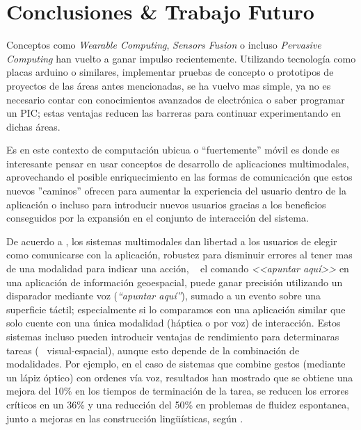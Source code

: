 
\chapter{Conclusiones \& Trabajo Futuro} %

\label{ch:end_future} %
Conceptos como \emph{Wearable Computing}, \emph{Sensors Fusion} o incluso \emph{Pervasive Computing} han vuelto a ganar impulso recientemente. Utilizando tecnología como placas arduino o similares, implementar pruebas de concepto o prototipos de proyectos de las áreas antes mencionadas, se ha vuelvo mas simple, ya no es necesario contar con conocimientos avanzados de electrónica o saber programar un PIC; estas ventajas reducen las barreras para continuar experimentando en dichas áreas.

Es en este contexto de computación ubicua o ``fuertemente'' móvil es donde es interesante pensar en usar conceptos de desarrollo de aplicaciones multimodales, aprovechando el posible enriquecimiento en las formas de comunicación que estos nuevos ''caminos'' ofrecen para aumentar la experiencia del usuario dentro de la aplicación o incluso para introducir nuevos usuarios gracias a los beneficios conseguidos por la expansión en el conjunto de interacción del sistema.


De acuerdo a \citet{kortum2008hci}, los sistemas multimodales dan libertad a los usuarios de elegir como comunicarse con la aplicación, robustez para disminuir errores al tener mas de una modalidad para indicar una acción, \eg~ el comando \emph{<<apuntar aquí>>} en una aplicación de información geoespacial, puede ganar precisión utilizando un disparador mediante voz (\emph{``apuntar aquí''}), sumado a un evento sobre una superficie táctil; especialmente si lo comparamos con una aplicación similar que solo cuente con una única modalidad (háptica o por voz) de interacción. Estos sistemas incluso pueden introducir ventajas de rendimiento para determinaras tareas (\eg~ visual-espacial), aunque esto depende de la combinación de modalidades. Por ejemplo, en el caso de sistemas que combine gestos (mediante un lápiz óptico) con ordenes vía voz, resultados han mostrado que se obtiene una mejora del 10\% en los tiempos de terminación de la tarea, se reducen los errores críticos en un 36\% y una reducción del 50\% en problemas de fluidez espontanea, junto a mejoras en las construcción lingüísticas, según \citet{oviatt1998referential}.

